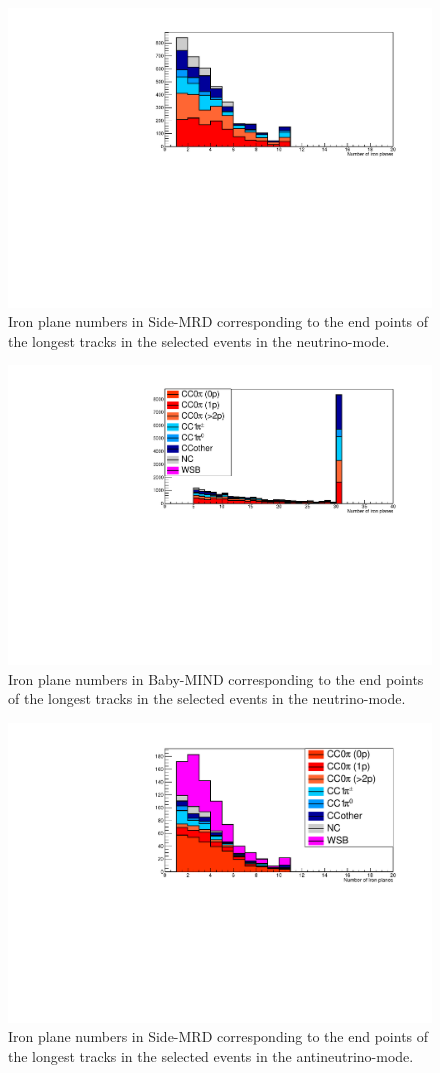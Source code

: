 \begin{figure}[tbh]
\begin{center}
\includegraphics[width=0.5\linewidth, angle=270]{fig/FHCMuonPenetration_SideMRD_StoppedOrThroughGoing.pdf}
\end{center}
\caption{
Iron plane numbers in Side-MRD corresponding to the end points of the longest tracks in the selected events in the neutrino-mode.
}
\label{fig:endpoint_smrd_longest_track_neutrino}
\end{figure}

\begin{figure}[tbh]
\begin{center}
\includegraphics[width=0.5\linewidth, angle=270]{fig/FHCMuonPenetration_DownstreamMRD_StoppedOrThroughGoing.pdf}
\end{center}
\caption{
Iron plane numbers in Baby-MIND corresponding to the end points of the longest tracks in the selected events in the neutrino-mode.
}
\label{fig:endpoint_babymind_longest_track_neutrino}
\end{figure}

\begin{figure}[tbh]
\begin{center}
\includegraphics[width=0.5\linewidth, angle=270]{fig/RHCMuonPenetration_SideMRD_StoppedOrThroughGoing.pdf}
\end{center}
\caption{
Iron plane numbers in Side-MRD corresponding to the end points of the longest tracks in the selected events in the antineutrino-mode.
}
\label{fig:endpoint_smrd_longest_track_antineutrino}
\end{figure}

